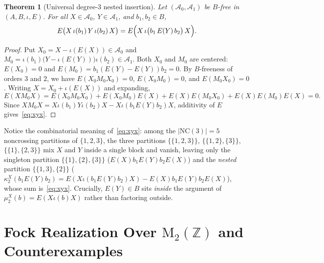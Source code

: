 \documentclass[11pt,a4paper]{article}
\newtheorem{theorem}{Theorem}[section]
\theoremstyle{definition}
\newcommand{\NC}{\mathrm{NC}}
\newcommand{\Mat}{\mathrm{M}}
\begin{document}
\begin{theorem}[Universal degree-3 nested insertion]\label{thm:xyx}
Let $(\mathcal{A}_0, \mathcal{A}_1)$ be $B$-free in $(A, B, \iota, E)$. For all $X \in \mathcal{A}_0$, $Y \in \mathcal{A}_1$, and $b_1, b_2 \in B$,
\begin{equation}\label{eq:xyx}
E\bigl(X\, \iota(b_1)\, Y\, \iota(b_2)\, X\bigr) = E\Bigl(X\, \iota\bigl(b_1\, E(Y)\, b_2\bigr)\, X\Bigr).
\end{equation}
\end{theorem}
\begin{proof}
Put $X_0 = X - \iota(E(X)) \in \mathcal{A}_0$ and $M_0 = \iota(b_1)\bigl(Y - \iota(E(Y))\bigr)\iota(b_2) \in \mathcal{A}_1$. Both $X_0$ and $M_0$ are centered: $E(X_0) = 0$ and $E(M_0) = b_1 (E(Y) - E(Y)) b_2 = 0$. By $B$-freeness of orders $3$ and $2$, we have $E(X_0 M_0 X_0) = 0$, $E(X_0 M_0) = 0$, and $E(M_0 X_0) = 0$. Writing $X = X_0 + \iota(E(X))$ and expanding,
\[
E(X M_0 X) = E(X_0 M_0 X_0) + E(X_0 M_0) E(X) + E(X) E(M_0 X_0) + E(X) E(M_0) E(X) = 0.
\]
Since $X M_0 X = X \iota(b_1) Y \iota(b_2) X - X \iota(b_1 E(Y) b_2) X$, additivity of $E$ gives~\eqref{eq:xyx}.
\end{proof}

Notice the combinatorial meaning of~\eqref{eq:xyx}: among the $|\NC(3)| = 5$ noncrossing partitions of $\{1, 2, 3\}$, the three partitions $\{\{1,2,3\}\}$, $\{\{1,2\},\{3\}\}$, $\{\{1\},\{2,3\}\}$ mix $X$ and $Y$ inside a single block and vanish, leaving only the singleton partition $\{\{1\},\{2\},\{3\}\}$ ($E(X) b_1 E(Y) b_2 E(X)$) and the \emph{nested} partition $\{\{1,3\},\{2\}\}$ ($\kappa_2^X(b_1 E(Y) b_2) = E(X \iota(b_1 E(Y) b_2) X) - E(X) b_1 E(Y) b_2 E(X)$), whose sum is~\eqref{eq:xyx}. Crucially, $E(Y) \in B$ sits \emph{inside} the argument of $\mu_2^X(b) = E(X \iota(b) X)$ rather than factoring outside.

\section{Fock Realization Over \texorpdfstring{$\Mat_2(\mathbb{Z})$}{M\_2(Z)} and Counterexamples}\label{sec:fock}
\end{document}
